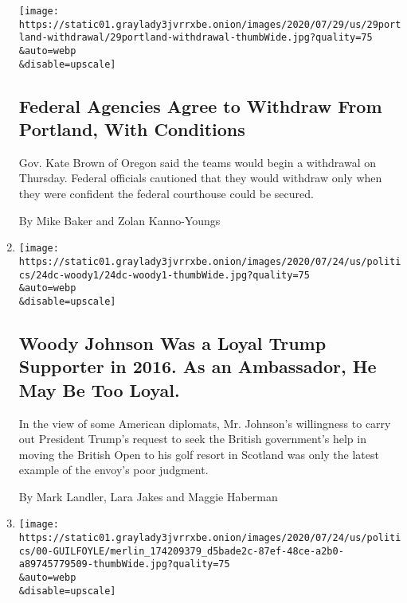 \begin{enumerate}
  \texttt{[image: https://static01.graylady3jvrrxbe.onion/images/2020/07/29/us/29portland-withdrawal/29portland-withdrawal-thumbWide.jpg?quality=75\\\&auto=webp\\\&disable=upscale]}

  \hypertarget{federal-agencies-agree-to-withdraw-from-portland-with-conditions}{%
  \subsection{Federal Agencies Agree to Withdraw From Portland, With
  Conditions}\label{federal-agencies-agree-to-withdraw-from-portland-with-conditions}}

  Gov. Kate Brown of Oregon said the teams would begin a withdrawal on
  Thursday. Federal officials cautioned that they would withdraw only
  when they were confident the federal courthouse could be secured.

  By Mike Baker and Zolan Kanno-Youngs
\item
  \href{/2020/07/24/world/europe/woody-johnson-trump.html}{}

  \texttt{[image: https://static01.graylady3jvrrxbe.onion/images/2020/07/24/us/politics/24dc-woody1/24dc-woody1-thumbWide.jpg?quality=75\\\&auto=webp\\\&disable=upscale]}

  \hypertarget{woody-johnson-was-a-loyal-trump-supporter-in-2016-as-an-ambassador-he-may-be-too-loyal}{%
  \subsection{Woody Johnson Was a Loyal Trump Supporter in 2016. As an
  Ambassador, He May Be Too
  Loyal.}\label{woody-johnson-was-a-loyal-trump-supporter-in-2016-as-an-ambassador-he-may-be-too-loyal}}

  In the view of some American diplomats, Mr. Johnson's willingness to
  carry out President Trump's request to seek the British government's
  help in moving the British Open to his golf resort in Scotland was
  only the latest example of the envoy's poor judgment.

  By Mark Landler, Lara Jakes and Maggie Haberman
\item
  \href{/2020/07/24/us/politics/kimberly-guilfoyles-trump-fundraising.html}{}

  \texttt{[image: https://static01.graylady3jvrrxbe.onion/images/2020/07/24/us/politics/00-GUILFOYLE/merlin\_174209379\_d5bade2c-87ef-48ce-a2b0-a89745779509-thumbWide.jpg?quality=75\\\&auto=webp\\\&disable=upscale]}

  \hypertarget{kimberly-guilfoyles-fund-raising-for-trump-draws-scrutiny}{%
}
\end{enumerate}
